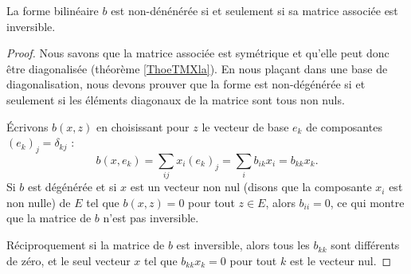 \begin{proposition}
    La forme bilinéaire \( b\) est non-dénénérée si et seulement si sa matrice associée est inversible.
\end{proposition}

\begin{proof}
    Nous savons que la matrice associée est symétrique et qu'elle peut donc être diagonalisée (théorème \ref{ThoeTMXla}). En nous plaçant dans une base de diagonalisation, nous devons prouver que la forme est non-dégénérée si et seulement si les éléments diagonaux de la matrice sont tous non nuls.

    Écrivons \( b(x,z)\) en choisissant pour \( z\) le vecteur de base \( e_k\) de composantes \( (e_k)_j=\delta_{kj}\) :
    \begin{equation}
            b(x,e_k)=\sum_{ij}x_i(e_k)_j
            =\sum_i b_{ik}x_i
            =b_{kk}x_k.
    \end{equation}
    Si \( b\) est dégénérée et si \( x\) est un vecteur non nul (disons que la composante \( x_i\) est non nulle) de \( E\) tel que \( b(x,z)=0\) pour tout \( z\in E\), alors \( b_{ii}=0\), ce qui montre que la matrice de \( b\) n'est pas inversible.

    Réciproquement si la matrice de \( b\) est inversible, alors tous les \( b_{kk}\) sont différents de zéro, et le seul vecteur \( x\) tel que \( b_{kk}x_k=0\) pour tout \( k\) est le vecteur nul.
\end{proof}


